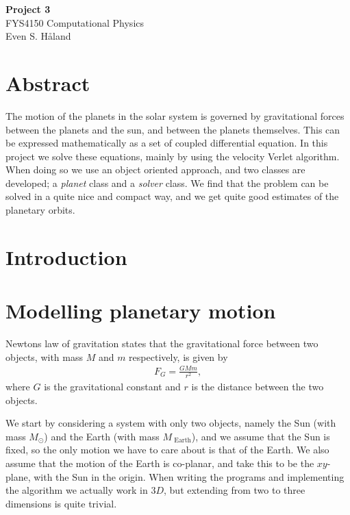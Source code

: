 \documentclass[12pt, a4paper]{article}
\begin{document}
\begin{titlepage}
\begin{center}
\vspace*{3cm}
\Huge
\textbf{Project 3} \\
\Large  
FYS4150 Computational Physics 
\vspace*{3cm} \\ 

Even S. Håland 
\vspace*{5cm} \\

\normalsize
\section*{Abstract}

The motion of the planets in the solar system is governed by gravitational forces between the planets 
and the sun, and between the planets themselves. This can be expressed mathematically as a set of coupled 
differential equation. In this project we solve these equations, mainly by using the velocity Verlet 
algorithm. When doing so we use an object oriented approach, and two classes are developed; a 
\textit{planet} class and a \textit{solver} class. We find that the problem can be solved in a quite nice 
and compact way, and we get quite good estimates of the planetary orbits.  

\end{center}
\end{titlepage}

\section{Introduction}



\section{Modelling planetary motion}

Newtons law of gravitation states that the gravitational force between two objects, with mass $M$ and $m$
respectively, is given by 
\begin{align}
F_G = \frac{GMm}{r^2}, 
\end{align}
where $G$ is the gravitational constant and $r$ is the distance between the two objects. 

We start by considering a system with only two objects, namely the Sun (with mass $M_{\odot}$) and the 
Earth (with mass $M_{\text{ Earth}}$), and we assume that the Sun is fixed, so the only motion we have to
care about is that of the Earth. We also assume that the motion of the Earth is co-planar, and take this 
to be the $xy$-plane, with the Sun in the origin. When writing the programs and implementing the 
algorithm we actually work in $3D$, but extending from two to three dimensions is quite trivial.  
\end{document}
